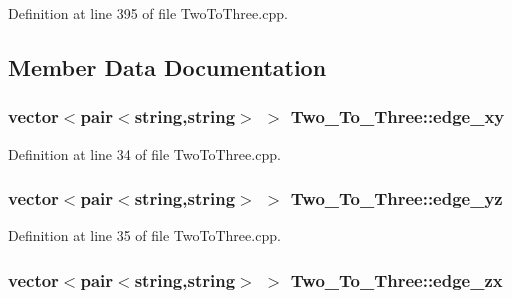 Definition at line 395 of file Two\+To\+Three.\+cpp.



\subsection{Member Data Documentation}
\subsubsection[{\texorpdfstring{edge\+\_\+xy}{edge_xy}}]{\setlength{\rightskip}{0pt plus 5cm}vector$<$pair$<$string,string$>$ $>$ Two\+\_\+\+To\+\_\+\+Three\+::edge\+\_\+xy}\hypertarget{class_two___to___three_aa0701d423859854d6dcf6a3948c3c797}{}\label{class_two___to___three_aa0701d423859854d6dcf6a3948c3c797}


Definition at line 34 of file Two\+To\+Three.\+cpp.

\subsubsection[{\texorpdfstring{edge\+\_\+yz}{edge_yz}}]{\setlength{\rightskip}{0pt plus 5cm}vector$<$pair$<$string,string$>$ $>$ Two\+\_\+\+To\+\_\+\+Three\+::edge\+\_\+yz}\hypertarget{class_two___to___three_a8fa25ea9719f9ecea3d8a521f5e7e14c}{}\label{class_two___to___three_a8fa25ea9719f9ecea3d8a521f5e7e14c}


Definition at line 35 of file Two\+To\+Three.\+cpp.

\subsubsection[{\texorpdfstring{edge\+\_\+zx}{edge_zx}}]{\setlength{\rightskip}{0pt plus 5cm}vector$<$pair$<$string,string$>$ $>$ Two\+\_\+\+To\+\_\+\+Three\+::edge\+\_\+zx}\hypertarget{class_two___to___three_a1a77bc05b0101d52a3cdeca1cda97382}{}\label{class_two___to___three_a1a77bc05b0101d52a3cdeca1cda97382}


